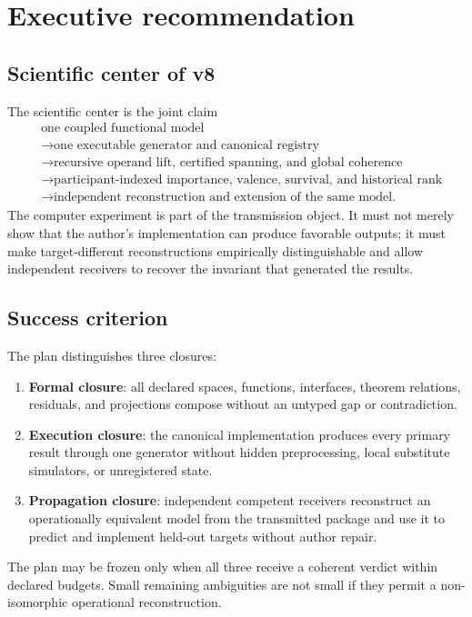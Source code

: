 \documentclass[11pt]{article}
\begin{document}
\tableofcontents
\newpage
\section{Executive recommendation}

\subsection{Scientific center of v8}

The scientific center is the joint claim
\begin{equation}
\boxed{\begin{aligned}
&\text{one coupled functional model}\\
&\rightarrow\text{one executable generator and canonical registry}\\
&\rightarrow\text{recursive operand lift, certified spanning, and global coherence}\\
&\rightarrow\text{participant-indexed importance, valence, survival, and historical rank}\\
&\rightarrow\text{independent reconstruction and extension of the same model.}
\end{aligned}}
\end{equation}
The computer experiment is part of the transmission object. It must not merely show that the author's implementation can produce favorable outputs; it must make target-different reconstructions empirically distinguishable and allow independent receivers to recover the invariant that generated the results.

\subsection{Success criterion}

The plan distinguishes three closures:
\begin{enumerate}
\item \textbf{Formal closure}: all declared spaces, functions, interfaces, theorem relations, residuals, and projections compose without an untyped gap or contradiction.
\item \textbf{Execution closure}: the canonical implementation produces every primary result through one generator without hidden preprocessing, local substitute simulators, or unregistered state.
\item \textbf{Propagation closure}: independent competent receivers reconstruct an operationally equivalent model from the transmitted package and use it to predict and implement held-out targets without author repair.
\end{enumerate}
The plan may be frozen only when all three receive a coherent verdict within declared budgets. Small remaining ambiguities are not small if they permit a non-isomorphic operational reconstruction.
\end{document}
